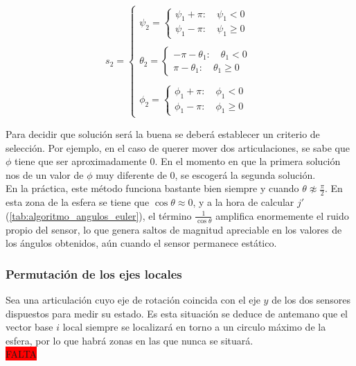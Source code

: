 \documentclass[12pt, a4paper]{report}
\begin{document}
$$ s_2 = \begin{cases}

\psi_2 = \begin{cases}
	\psi_1 + \pi : \quad \psi_1 < 0 \\
	\psi_1 - \pi : \quad \psi_1 \geq 0 
\end{cases}\\
\\
\theta_2 = \begin{cases}
	-\pi - \theta_1 : \quad \theta_1 < 0 \\
	\pi - \theta_1 : \quad \theta_1 \geq 0 
\end{cases}\\
\\
\phi_2 = \begin{cases}
	\phi_1 + \pi : \quad \phi_1 < 0 \\
	\phi_1 - \pi : \quad \phi_1 \geq 0 
\end{cases}
\end{cases}
$$

Para decidir que solución será la buena se deberá establecer un criterio de selección. Por ejemplo, en el caso de querer mover dos articulaciones, se sabe que $\phi$ tiene que ser aproximadamente $0$. En el momento en que la primera solución nos de un valor de $\phi$ muy diferente de $0$, se escogerá la segunda solución.\\

En la práctica, este método funciona bastante bien siempre y cuando $\theta \not\approx \frac{\pi}{2}$. En esta zona de la esfera se tiene que $\cos\theta \approx 0$, y a la hora de calcular $ j'$ (\ref{tab:algoritmo_angulos_euler}), el término $\frac{1}{\cos\theta}$ amplifica enormemente el ruido propio del sensor, lo que genera saltos de magnitud apreciable en los valores de los ángulos obtenidos, aún cuando el sensor permanece estático.

\subsubsection{Permutación de los ejes locales}

Sea una articulación cuyo eje de rotación coincida con el eje $y$ de los dos sensores dispuestos para medir su estado. Es esta situación se deduce de antemano que el vector base $i$ local siempre se localizará en torno a un circulo máximo de la esfera, por lo que habrá zonas en las que nunca se situará. \\ 

\colorbox{red}{FALTA}
\end{document}

